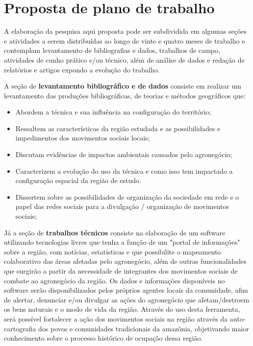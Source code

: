 \section{Proposta de plano de trabalho}

A elaboração da pesquisa aqui proposta pode ser subdividida em algumas seções e atividades a serem distribuídas ao longo de vinte e quatro meses de trabalho e contemplam levantamento de bibliografias e dados, trabalhos de campo, atividades de cunho prático e/ou técnico, além de análise de dados e redação de relatórios e artigos expondo a evolução do trabalho.

A seção de \textbf{levantamento bibliográfico e de dados} consiste em realizar um levantamento das produções bibliográficas, de teorias e métodos geográficos que:

\begin{itemize}
 \item Abordem a técnica e sua influência na configuração do território;
 \item Ressaltem as características da região estudada e as possibilidades e impedimentos dos movimentos sociais locais;
 \item Discutam evidências de impactos ambientais causados pelo agronegócio;
 \item Caracterizem a evolução do uso da técnica e como isso tem impactado a configuração espacial da região de estudo.
 \item Dissertem sobre as possibilidades de organização da sociedade em rede e o papel das redes sociais para a divulgação / organização de movimentos sociais;
\end{itemize}

Já a seção de \textbf{trabalhos técnicos} consiste na elaboração de um software utilizando tecnologias livres que tenha a função de um "portal de informações" sobre a região, com notícias, estatísticas e que possibilite o mapeamento colaborativo das áreas afetadas pelo agronegócio, além de outras funcionalidades que surgirão a partir da necessidade de integrantes dos movimentos sociais de combate ao agronegócio da região. Os dados e informações disponíveis no software serão disponibilizados pelos próprios agentes locais da comunidade, afim de alertar, denunciar e/ou divulgar as ações do agronegócio que afetam/destroem os bens naturais e o modo de vida da região. Através do uso desta ferramenta, será possível fortalecer a ação dos movimentos sociais na região através da auto-cartografia dos povos e comunidades tradicionais da amazônia, objetivando maior conhecimento sobre o processo histórico de ocupação dessa região.

